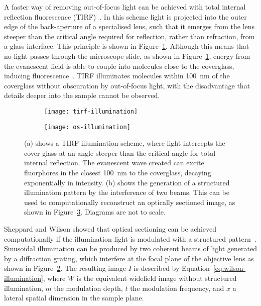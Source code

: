 A faster way of removing out-of-focus light can be achieved with total internal reflection fluorescence (TIRF)~\cite[\textit{ch. 21}]{periasamy2013methods}. 
In this scheme light is projected into the outer edge of the back-aperture of a specialised lens, such that it emerges from the lens steeper than the critical angle required for reflection, rather than refraction, from a glass interface. 
This principle is shown in Figure~\ref{fig:tirf-illumination}. 
Although this means that no light passes through the microscope slide, as shown in Figure~\ref{fig:tirf-illumination}, energy from the evanescent field is able to couple into molecules close to the coverglass, inducing fluorescence~\cite{axelrod1981cell}. 
TIRF illuminates molecules within \SI{100}{\nano\metre} of the coverglass without obscuration by out-of-focus light, with the disadvantage that details deeper into the sample cannot be observed.

\begin{figure}[tbp]
\centering
\begin{subfigure}[b]{0.49\textwidth}
	\texttt{[image: tirf-illumination]}
	\caption{}\label{fig:tirf-illumination}
\end{subfigure}
\hfill
\begin{subfigure}[b]{0.49\textwidth}
	\texttt{[image: os-illumination]}
	\caption{}\label{fig:os-illumination}
\end{subfigure}
\caption[LAG SIM: Both TIRF microscopy and structured illumination patterns can be used to remove out of focus light]{(a) shows a TIRF illumination scheme, where light intercepts the cover glass at an angle steeper than the critical angle for total internal reflection. The evanescent wave created can excite fluorphores in the closest \SI{100}{\nano\metre} to the coverglass, decaying exponentially in intensity. (b) shows the generation of a structured illumination pattern by the interference of two beams. This can be used to computationally reconstruct an optically sectioned image, as shown in Figure~\ref{fig:os-sim-comparison}. Diagrams are not to scale. }
\label{fig:os-sim-comparison}
\end{figure}

Sheppard and Wilson showed that optical sectioning can be achieved computationally if the illumination light is modulated with a structured pattern~\cite{pawley2012handbook, neil1997method}. 
Sinusoidal illumination can be produced by two coherent beams of light generated by a diffraction grating, which interfere at the focal plane of the objective lens as shown in Figure~\ref{fig:os-illumination}. 
The resulting image $I$ is described by Equation~\ref{eq:wilson-illumination}, where $W$ is the equivalent widefield image without structured illumination, $m$ the modulation depth, $t$ the modulation frequency, and $x$ a lateral spatial dimension in the sample plane.  

